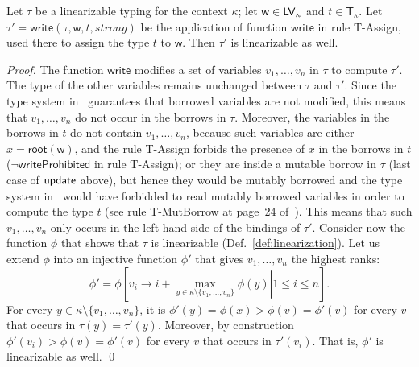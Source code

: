 \begin{lemma}\label{lem:write_invariant}
  Let $\tau$ be a linearizable typing for the context $\kappa$;
  let $\mathsf{w}\in\mathsf{LV}_\kappa$ and $t\in\mathsf{T}_\kappa$.
  Let $\tau'=\mathsf{write}(\tau,\mathsf{w},t,\mathit{strong})$ be
  the application of function $\mathsf{write}$ in rule \textsf{T-Assign},
  used there to assign the type $t$ to $\mathsf{w}$.
  Then $\tau'$ is linearizable as well.
\end{lemma}
\begin{proof}
  The function $\mathsf{write}$ modifies a set of variables $v_1,\ldots,v_n$ in $\tau$ to compute $\tau'$.
  The type of the other variables remains unchanged between $\tau$ and $\tau'$. Since the
  type system in~\cite{Pearce21} guarantees that borrowed variables are not modified,
  this means that $v_1,\ldots,v_n$ do not occur in the borrows in $\tau$. Moreover,
  the variables in the borrows in $t$ do not contain $v_1,\ldots,v_n$, because
  such variables are either $x=\mathsf{root}(\mathsf{w})$, and the rule \textsf{T-Assign}
  forbids the presence of $x$ in the borrows in $t$ ($\neg\mathsf{writeProhibited}$ in rule
  \textsf{T-Assign}); or they are inside a mutable borrow in $\tau$ (last case of
  $\mathsf{update}$ above), but hence they would be mutably borrowed and the type system
  in~\cite{Pearce21} would have forbidded to read mutably borrowed variables in order to compute
  the type $t$ (see rule \textsf{T-MutBorrow} at page~24 of~\cite{Pearce21}).
  This means that such $v_1,\ldots,v_n$ only occurs in the left-hand side of the bindings of $\tau'$.
  Consider now the function $\phi$ that shows that $\tau$ is linearizable (Def.~\ref{def:linearization}).
  Let us extend $\phi$ into an injective function $\phi'$ that gives $v_1,\ldots,v_n$ the highest ranks:
  \[
  \phi'=\phi\left[\left.v_i\to i+\max\limits_{y\in\kappa\setminus\{v_1,\ldots,v_n\}}\phi(y)\right|1\le i\le n\right].
  \]
  For every $y\in\kappa\setminus\{v_1,\ldots,v_n\}$, it is
  $\phi'(y)=\phi(x)>\phi(v)=\phi'(v)$ for every $v$ that occurs in $\tau(y)=\tau'(y)$.
  Moreover, by construction $\phi'(v_i)>\phi(v)=\phi'(v)$ for every $v$ that occurs in $\tau'(v_i)$.
  That is, $\phi'$ is linearizable as well.
  \qed
\end{proof}
